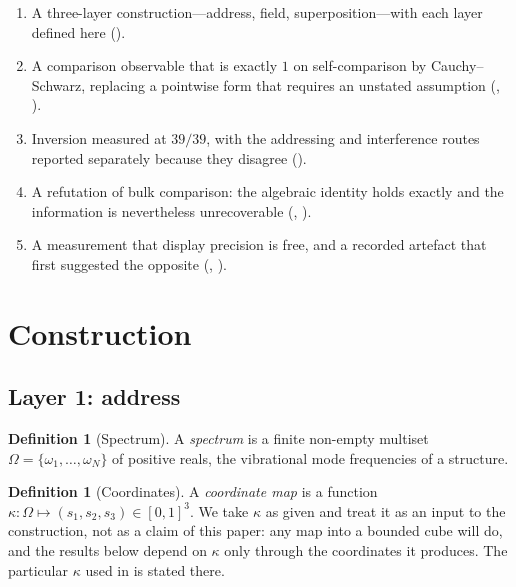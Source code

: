 \documentclass[11pt,twocolumn,a4paper]{article}
\theoremstyle{upthm}
\theoremstyle{definition}
\newtheorem{definition}[theorem]{Definition}
\theoremstyle{remark}
\begin{document}
\begin{enumerate}[label=(\roman*),leftmargin=2.2em,itemsep=2pt]
\item A three-layer construction---address, field, superposition---with
each layer defined here ().
\item A comparison observable that is exactly $1$ on self-comparison by
Cauchy--Schwarz, replacing a pointwise form that requires an unstated
assumption (, ).
\item Inversion measured at $39/39$, with the addressing and
interference routes reported separately because they disagree
().
\item A refutation of bulk comparison: the algebraic identity holds
exactly and the information is nevertheless unrecoverable
(, ).
\item A measurement that display precision is free, and a recorded
artefact that first suggested the opposite (,
).
\end{enumerate}

\section{Construction}
\label{sec:construction}

\subsection{Layer 1: address}

\begin{definition}[Spectrum]
\label{def:spectrum}
A \emph{spectrum} is a finite non-empty multiset
$\Omega=\{\omega_1,\dots,\omega_N\}$ of positive reals, the vibrational
mode frequencies of a structure.
\end{definition}

\begin{definition}[Coordinates]
\label{def:coords}
A \emph{coordinate map} is a function
$\kappa:\Omega\mapsto(s_1,s_2,s_3)\in[0,1]^3$. We take $\kappa$ as given
and treat it as an input to the construction, not as a claim of this
paper: any map into a bounded cube will do, and the results below depend
on $\kappa$ only through the coordinates it produces. The particular
$\kappa$ used in  is stated there.
\end{definition}
\end{document}
